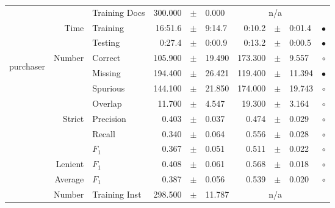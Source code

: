 \begin{longtable}{|r|r|l||rcl|rcl|c|}
\cline{3-10} &                             &   Training Docs &     300.000 &  $\pm$  &       0.000 &    \multicolumn{3}{c|}{n/a}         &  \\
\cline{2-10} & \multirow{2}{*}{      Time} &        Training &     16:51.6 &  $\pm$  &      9:14.7 &      0:10.2 &  $\pm$  &      0:01.4 & $\bullet$ \\
\cline{3-10} &                             &         Testing &      0:27.4 &  $\pm$  &      0:00.9 &      0:13.2 &  $\pm$  &      0:00.5 & $\bullet$ \\
\hline
\hline
\multirow{11}{*}{\begin{sideways}purchaser\end{sideways} }
             & \multirow{4}{*}{    Number} &         Correct &     105.900 &  $\pm$  &      19.490 &     173.300 &  $\pm$  &       9.557 & $\circ$ \\
\cline{3-10} &                             &         Missing &     194.400 &  $\pm$  &      26.421 &     119.400 &  $\pm$  &      11.394 & $\bullet$ \\
\cline{3-10} &                             &        Spurious &     144.100 &  $\pm$  &      21.850 &     174.000 &  $\pm$  &      19.743 & $\circ$ \\
\cline{3-10} &                             &         Overlap &      11.700 &  $\pm$  &       4.547 &      19.300 &  $\pm$  &       3.164 & $\circ$ \\
\cline{2-10} & \multirow{3}{*}{    Strict} &       Precision &       0.403 &  $\pm$  &       0.037 &       0.474 &  $\pm$  &       0.029 & $\circ$ \\
\cline{3-10} &                             &          Recall &       0.340 &  $\pm$  &       0.064 &       0.556 &  $\pm$  &       0.028 & $\circ$ \\
\cline{3-10} &                             &           $F_1$ &       0.367 &  $\pm$  &       0.051 &       0.511 &  $\pm$  &       0.022 & $\circ$ \\
\cline{2-10} &                     Lenient &           $F_1$ &       0.408 &  $\pm$  &       0.061 &       0.568 &  $\pm$  &       0.018 & $\circ$ \\
\cline{2-10} &                     Average &           $F_1$ &       0.387 &  $\pm$  &       0.056 &       0.539 &  $\pm$  &       0.020 & $\circ$ \\
\cline{2-10} & \multirow{2}{*}{    Number} &   Training Inst &     298.500 &  $\pm$  &      11.787 &    \multicolumn{3}{c|}{n/a}         &  \\

\end{longtable}
